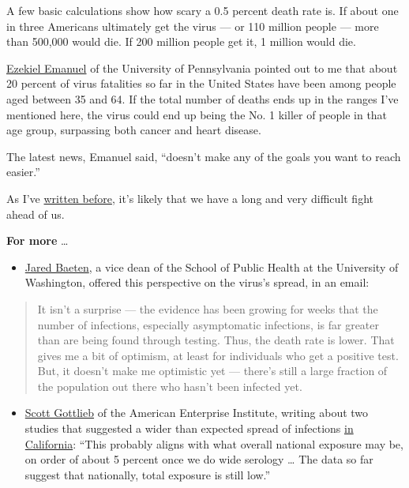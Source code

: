 A few basic calculations show how scary a 0.5 percent death rate is. If
about one in three Americans ultimately get the virus --- or 110 million
people --- more than 500,000 would die. If 200 million people get it, 1
million would die.

\href{https://www.nytimes.com/topic/person/ezekiel-j-emanuel}{Ezekiel
Emanuel} of the University of Pennsylvania pointed out to me that about
20 percent of virus fatalities so far in the United States have been
among people aged between 35 and 64. If the total number of deaths ends
up in the ranges I've mentioned here, the virus could end up being the
No. 1 killer of people in that age group, surpassing both cancer and
heart disease.

The latest news, Emanuel said, ``doesn't make any of the goals you want
to reach easier.''

As I've
\href{https://www.nytimes.com/2020/04/10/opinion/coronavirus-social-distancing.html}{written
before}, it's likely that we have a long and very difficult fight ahead
of us.

\textbf{For more} \ldots{}

\begin{itemize}
\tightlist
\item
  \href{https://globalhealth.washington.edu/faculty/jared-baeten}{Jared
  Baeten}, a vice dean of the School of Public Health at the University
  of Washington, offered this perspective on the virus's spread, in an
  email:
\end{itemize}

\begin{quote}
It isn't a surprise --- the evidence has been growing for weeks that the
number of infections, especially asymptomatic infections, is far greater
than are being found through testing. Thus, the death rate is lower.
That gives me a bit of optimism, at least for individuals who get a
positive test. But, it doesn't make me optimistic yet --- there's still
a large fraction of the population out there who hasn't been infected
yet.
\end{quote}

\begin{itemize}
\tightlist
\item
  \href{https://twitter.com/ScottGottliebMD/status/1251207647166160901}{Scott
  Gottlieb} of the American Enterprise Institute, writing about two
  studies that suggested a wider than expected spread of infections
  \href{https://www.nytimes.com/2020/04/21/health/coronavirus-antibodies-california.html}{in
  California}: ``This probably aligns with what overall national
  exposure may be, on order of about 5 percent once we do wide serology
  \ldots{} The data so far suggest that nationally, total exposure is
  still low.''
\end{itemize}

